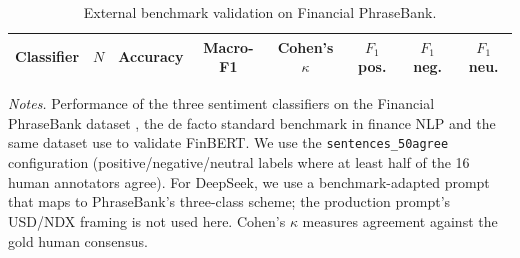 \begin{table}[!htbp]
\centering
\caption{External benchmark validation on Financial PhraseBank.}
\label{tab:external-benchmark}
\begin{threeparttable}
\small
\begin{tabular}{lrcccccc}
\toprule
\textbf{Classifier} & \textbf{$N$} & \textbf{Accuracy} & \textbf{Macro-F1} & \textbf{Cohen's $\kappa$} & \textbf{$F_1$ pos.} & \textbf{$F_1$ neg.} & \textbf{$F_1$ neu.} \\
\midrule
\bottomrule
\end{tabular}
\begin{tablenotes}
\footnotesize
\item \textit{Notes.} Performance of the three sentiment classifiers
on the Financial PhraseBank dataset \citep{malo2014good}, the
de facto standard benchmark in finance NLP and the same dataset
\citet{yang2020finbert} use to validate FinBERT. We use the
\texttt{sentences\_50agree} configuration (positive/negative/neutral
labels where at least half of the 16 human annotators agree).
For DeepSeek, we use a benchmark-adapted prompt that maps to
PhraseBank's three-class scheme; the production prompt's
USD/NDX framing is not used here. Cohen's $\kappa$ measures
agreement against the gold human consensus.
\end{tablenotes}
\end{threeparttable}
\end{table}
